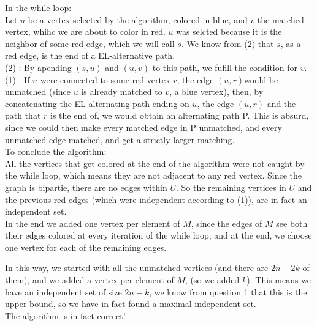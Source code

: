 \documentclass{scrartcl}
\begin{document}
In the while loop: \\

Let \( u \) be a vertex selected by the algorithm, colored in blue, and \( v \) the matched vertex, whihc we are about to color in red. \( u \) was selcted because it is the neighbor of some red edge, which we will call \(s\). We know from (2) that \( s \), as a red edge, is the end of a EL-alternative path. \\

(2) : By apending \( (s,u) \) and \( (u,v) \) to this path, we fufill the condition for \( v\). \\
(1) : If \( u\)  were connected to some red vertex \( r\), the edge \( (u,r) \)would be unmatched (since \( u \) is already matched to \( v \), a blue vertex), then, by concatenating the EL-alternating path ending on \( u \), the edge \( (u,r) \) and the path that \( r \) is the end of, we would obtain an alternating path P. This is absurd, since we could then make every matched edge in P unmatched, and every unmatched edge matched, and get a strictly larger matching. \\

To conclude the algorithm: \\
All the vertices that get colored at the end of the algorithm were not caught by the while loop, which means they are not adjacent to any red vertex. Since the graph is bipartie, there are no edges within \( U \). So the remaining vertices in \( U \) and the previous red edges (which were independent according to (1)), are in fact an independent set.\\

In the end we added one vertex per element of \(M\), since the edges of \( M \) see both their edges colored at every iteration of the while loop, and at the end, we choose one vertex for each of the remaining edges.



In this way, we started with all the unmatched vertices (and there are \( 2n - 2k \) of them), and we added a vertex per element of \( M \), (so we added \( k \)). This means we have an independent set of size \( 2n -k \), we know from question 1 that this is the upper bound, so we have in fact found a maximal independent set.\\

The algorithm is in fact correct!
\end{document}
